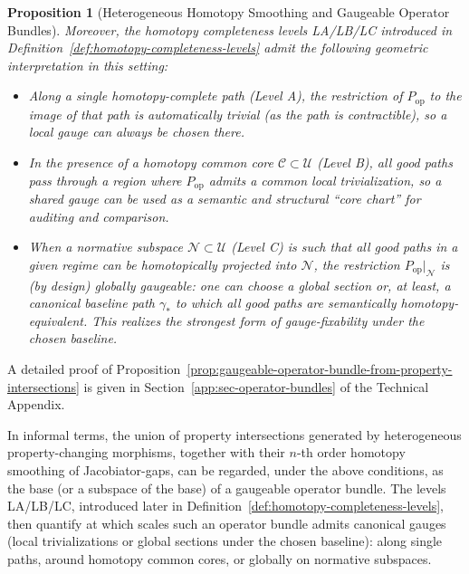 \documentclass[11pt]{book}
\theoremstyle{plain}
\newtheorem{proposition}[theorem]{Proposition}
\theoremstyle{definition}
\theoremstyle{remark}
\begin{document}
\begin{proposition}[Heterogeneous Homotopy Smoothing and Gaugeable Operator Bundles]
Moreover, the homotopy completeness levels LA/LB/LC introduced in
Definition~\ref{def:homotopy-completeness-levels} admit the following
geometric interpretation in this setting:
\begin{itemize}
  \item Along a single homotopy-complete path (Level A), the restriction
        of $P_{\mathrm{op}}$ to the image of that path is automatically
        trivial (as the path is contractible), so a local gauge can always
        be chosen there.
  \item In the presence of a homotopy common core
        $\mathcal{C}\subset\mathcal{U}$ (Level B), all good paths pass
        through a region where $P_{\mathrm{op}}$ admits a common local
        trivialization, so a shared gauge can be used as a semantic and
        structural ``core chart'' for auditing and comparison.
  \item When a normative subspace $\mathcal{N}\subset\mathcal{U}$ (Level C)
        is such that all good paths in a given regime can be homotopically
        projected into $\mathcal{N}$, the restriction
        $P_{\mathrm{op}}\vert_{\mathcal{N}}$ is (by design) globally
        gaugeable: one can choose a global section or, at least, a canonical
        baseline path $\gamma_\ast$ to which all good paths are semantically
        homotopy-equivalent. This realizes the strongest form of
        gauge-fixability under the chosen baseline.
\end{itemize}
\end{proposition}

A detailed proof of
Proposition~\ref{prop:gaugeable-operator-bundle-from-property-intersections}
is given in Section~\ref{app:sec-operator-bundles} of the Technical Appendix.

In informal terms, the union of property intersections generated by
heterogeneous property-changing morphisms, together with their $n$-th
order homotopy smoothing of Jacobiator-gaps, can be regarded, under the
above conditions, as the base (or a subspace of the base) of a gaugeable
operator bundle. The levels LA/LB/LC, introduced later in
Definition~\ref{def:homotopy-completeness-levels}, then quantify at which
scales such an operator bundle admits canonical gauges (local
trivializations or global sections under the chosen baseline): along single
paths, around homotopy common cores, or globally on normative subspaces.
\end{document}
